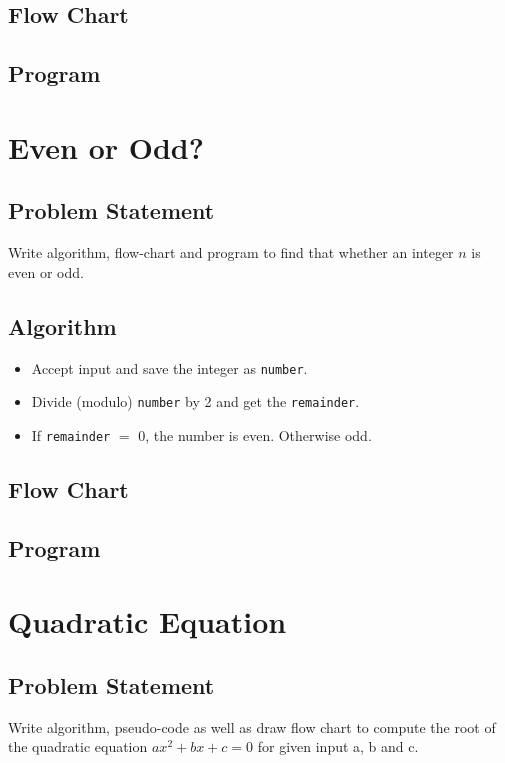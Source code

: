 \documentclass[11pt]{report}
\begin{document}
\section{Flow Chart}
\leavevmode\newpage
\section{Program}



\chapter{Even or Odd?}
\section{Problem Statement}
Write algorithm, flow-chart and program to find that whether an integer $n$ is even or odd.
\section{Algorithm}
\begin{itemize}
  \item Accept input and save the integer as \texttt{number}.
  \item Divide (modulo) \texttt{number} by 2 and get the \texttt{remainder}.
  \item If \texttt{remainder} $=$ 0, the number is even. Otherwise odd.
\end{itemize}
\section{Flow Chart}
\leavevmode\newpage
\section{Program}



\chapter{Quadratic Equation}
\section{Problem Statement}
Write algorithm, pseudo-code as well as draw flow chart to compute the root of the quadratic equation $ ax^2+bx+c = 0$ for given input a, b and c.
\end{document}
